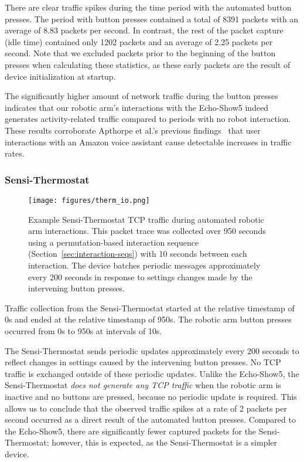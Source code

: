 There are clear traffic spikes during the time period with the automated button presses. The period with button presses contained a total of 8391 packets with an average of 8.83 packets per second. In contrast, the rest of the packet capture (idle time) contained only 1202 packets and an average of 2.25 packets per second. Note that we excluded packets prior to the beginning of the button presses when calculating these statistics, as these early packets are the result of device initialization at startup. 

The significantly higher amount of network traffic during the button presses indicates that our robotic arm's interactions with the Echo-Show5 indeed generates activity-related traffic compared to periods with no robot interaction. 
These results corroborate Apthorpe et al.'s previous findings~\cite{apthorpe2019keeping} that user interactions with an Amazon voice assistant cause detectable increases in traffic rates.

\subsubsection{Sensi-Thermostat} 

\begin{figure*}[t]
    \centering
    \texttt{[image: figures/therm\_io.png]}
    \caption{Example Sensi-Thermostat TCP traffic during automated robotic arm interactions. This packet trace was collected over 950 seconds using a permutation-based interaction sequence (Section~\ref{sec:interaction-seqs}) with 10 seconds between each interaction. The device batches periodic messages approximately every 200 seconds in response to settings changes made by the intervening button presses.}    \label{fig:therm_io}
\end{figure*}

Traffic collection from the Sensi-Thermostat started at the relative timestamp of 0s and ended at the relative timestamp of 950s. The robotic arm button presses occurred from 0s to 950s at intervals of 10s. 

The Sensi-Thermostat sends periodic updates approximately every 200 seconds to reflect changes in settings caused by the intervening button presses. No TCP traffic is exchanged outside of these periodic updates. Unlike the Echo-Show5, the Sensi-Thermostat \textit{does not generate any TCP traffic} when the robotic arm is inactive and no buttons are pressed, because no periodic update is required. This allows us to conclude that the observed traffic spikes at a rate of 2 packets per second occurred as a direct result of the automated button presses. 
Compared to the Echo-Show5, there are significantly fewer captured packets for the Sensi-Thermostat; however, this is expected, as the Sensi-Thermostat is a simpler device.

